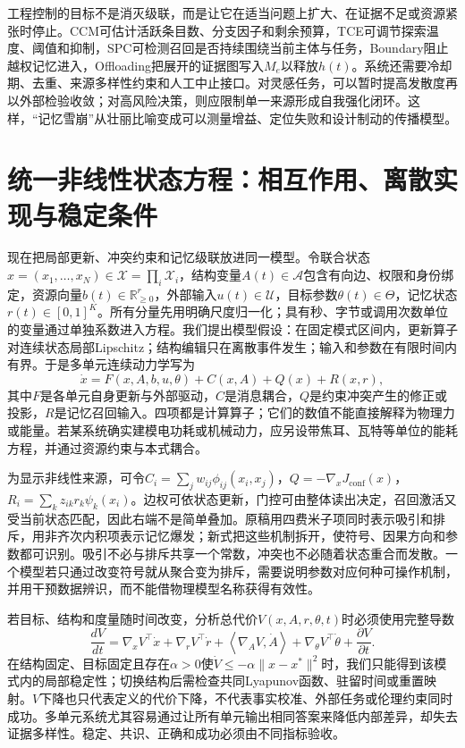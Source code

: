 工程控制的目标不是消灭级联，而是让它在适当问题上扩大、在证据不足或资源紧张时停止。CCM可估计活跃条目数、分支因子和剩余预算，TCE可调节探索温度、阈值和抑制，SPC可检测召回是否持续围绕当前主体与任务，Boundary阻止越权记忆进入，Offloading把展开的证据图写入$M_e$以释放$h(t)$。系统还需要冷却期、去重、来源多样性约束和人工中止接口。对灵感任务，可以暂时提高发散度再以外部检验收敛；对高风险决策，则应限制单一来源形成自我强化闭环。这样，“记忆雪崩”从壮丽比喻变成可以测量增益、定位失败和设计制动的传播模型。

\section{统一非线性状态方程：相互作用、离散实现与稳定条件}
\label{sec:nonlinear_teleological_dirac_equation}

现在把局部更新、冲突约束和记忆级联放进同一模型。令联合状态$x=(x_1,\ldots,x_N)\in\mathcal X=\prod_i\mathcal X_i$，结构变量$A(t)\in\mathcal A$包含有向边、权限和身份绑定，资源向量$b(t)\in\mathbb R_{\geq 0}^r$，外部输入$u(t)\in\mathcal U$，目标参数$\theta(t)\in\Theta$，记忆状态$r(t)\in[0,1]^K$。所有分量先用明确尺度归一化；具有秒、字节或调用次数单位的变量通过单独系数进入方程。我们提出模型假设：在固定模式区间内，更新算子对连续状态局部Lipschitz；结构编辑只在离散事件发生；输入和参数在有限时间内有界。于是多单元连续动力学写为
\begin{equation}
\dot x=F(x,A,b,u,\theta)+C(x,A)+Q(x)+R(x,r),
\label{eq:many_body_state_dynamics}
\end{equation}
其中$F$是各单元自身更新与外部驱动，$C$是消息耦合，$Q$是约束冲突产生的修正或投影，$R$是记忆召回输入。四项都是计算算子；它们的数值不能直接解释为物理力或能量。若某系统确实建模电功耗或机械动力，应另设带焦耳、瓦特等单位的能耗方程，并通过资源约束与本式耦合。

为显示非线性来源，可令$C_i=\sum_jw_{ij}\phi_{ij}(x_i,x_j)$，$Q=-\nabla_xJ_{\mathrm{conf}}(x)$，$R_i=\sum_kz_{ik}r_k\psi_k(x_i)$。边权可依状态更新，门控可由整体读出决定，召回激活又受当前状态匹配，因此右端不是简单叠加。原稿用四费米子项同时表示吸引和排斥，用非齐次内积项表示记忆爆发；新式把这些机制拆开，使符号、因果方向和参数都可识别。吸引不必与排斥共享一个常数，冲突也不必随着状态重合而发散。一个模型若只通过改变符号就从聚合变为排斥，需要说明参数对应何种可操作机制，并用干预数据辨识，而不能借物理模型名称获得有效性。

若目标、结构和度量随时间改变，分析总代价$V(x,A,r,\theta,t)$时必须使用完整导数
\begin{equation}
\frac{dV}{dt}=\nabla_xV^\top\dot x+\nabla_rV^\top\dot r
+\left\langle\nabla_AV,\dot A\right\rangle
+\nabla_\theta V^\top\dot\theta+\frac{\partial V}{\partial t}.
\end{equation}
在结构固定、目标固定且存在$\alpha>0$使$\dot V\leq-\alpha\|x-x^*\|^2$时，我们只能得到该模式内的局部稳定性；切换结构后需检查共同Lyapunov函数、驻留时间或重置映射。$V$下降也只代表定义的代价下降，不代表事实校准、外部任务或伦理约束同时成功。多单元系统尤其容易通过让所有单元输出相同答案来降低内部差异，却失去证据多样性。稳定、共识、正确和成功必须由不同指标验收。

